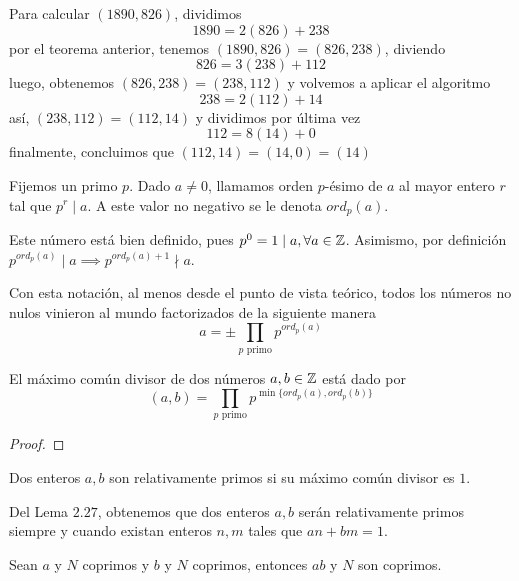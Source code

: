 \documentclass[main.tex]{subfiles}
\begin{document}
\begin{example}
    Para calcular $(1890, 826)$, dividimos
    $$1890 = 2(826) + 238$$
    por el teorema anterior, tenemos $(1890, 826) = (826, 238)$, diviendo
    $$826 = 3(238) + 112$$
    luego, obtenemos $(826, 238) = (238, 112)$ y volvemos a aplicar el algoritmo
    $$238 = 2(112) + 14$$
    as\'i, $(238, 112) = (112, 14)$ y dividimos por \'ultima vez
    $$112 = 8(14) + 0$$
    finalmente, concluimos que $(112, 14) = (14, 0) = (14)$
\end{example}

\begin{defn}
    Fijemos un primo $p$. Dado $a \not= 0$, llamamos orden $p$-\'esimo de $a$ al mayor entero $r$ tal que $p^r \mid a$. A este valor no negativo se le denota $ord_p(a)$.
\end{defn}

\begin{remark}
    Este n\'umero est\'a bien definido, pues $p^0 = 1 \mid a, \forall a \in \mathbb Z$. Asimismo, por definici\'on $p^{ord_p(a)} \mid a \implies p^{ord_p(a) + 1} \nmid a$.
\end{remark}

Con esta notaci\'on, al menos desde el punto de vista te\'orico, todos los n\'umeros no nulos vinieron al mundo factorizados de la siguiente manera
$$a = \pm \prod_{p \text{ primo}} p^{ord_p(a)}$$

\begin{theorem}
    El m\'aximo com\'un divisor de dos n\'umeros $a, b \in \mathbb Z$ est\'a dado por
    $$(a, b) = \prod_{p \text{ primo}} p^{\min\{ord_p(a), ord_p(b)\}}$$
\end{theorem}

\begin{proof}
    
\end{proof}

\begin{defn}
    Dos enteros $a, b$ son relativamente primos si su m\'aximo com\'un divisor es $1$.
\end{defn}

\begin{remark}
    Del Lema $2.27$, obtenemos que dos enteros $a, b$ ser\'an relativamente primos siempre y cuando existan enteros $n, m$ tales que $a n + b m = 1$.
\end{remark}

\begin{theorem}
    Sean $a$ y $N$ coprimos y $b$ y $N$ coprimos, entonces $ab$ y $N$ son coprimos.
\end{theorem}
\end{document}
